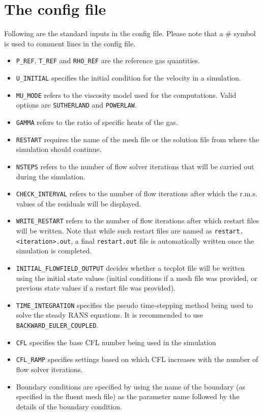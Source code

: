 \documentclass{article}
\begin{document}
\section{The config file}
Following are the standard inputs in the config file. Please note that a \# symbol is used to comment lines in the config file.
\begin{itemize}
    \item \texttt{P\_REF}, \texttt{T\_REF} and \texttt{RHO\_REF} are the reference gas quantities.
    \item \texttt{U\_INITIAL} specifies the initial condition for the velocity in a simulation.
    \item \texttt{MU\_MODE} refers to the viscosity model used for the computations. Valid options are \texttt{SUTHERLAND} and \texttt{POWERLAW}.
    \item \texttt{GAMMA} refers to the ratio of specific heats of the gas.
    \item \texttt{RESTART} requires the name of the mesh file or the solution file from where the simulation should continue.
    \item \texttt{NSTEPS} refers to the number of flow solver iterations that will be carried out during the simulation.
    \item \texttt{CHECK\_INTERVAL} refers to the number of flow iterations after which the r.m.s. values of the residuals will be displayed.
    \item \texttt{WRITE\_RESTART} refers to the number of flow iterations after which restart files will be written. Note that while such restart files are named as \texttt{restart.<iteration>.out}, a final \texttt{restart.out} file is automatically written once the simulation is completed.
    \item \texttt{INITIAL\_FLOWFIELD\_OUTPUT} decides whether a tecplot file will be written using the initial state values (initial conditions if a mesh file was provided, or previous state values if a restart file was provided).
    \item \texttt{TIME\_INTEGRATION} specifies the pseudo time-stepping method being used to solve the steady RANS equations. It is recommended to use \texttt{BACKWARD\_EULER\_COUPLED}.
    \item \texttt{CFL} specifies the base CFL number being used in the simulation
    \item \texttt{CFL\_RAMP} specifies settings based on which CFL increases with the number of flow solver iterations.
    \item Boundary conditions are specified by using the name of the boundary (as specified in the fluent mesh file) as the parameter name followed by the details of the boundary condition.

\end{itemize}
\end{document}
